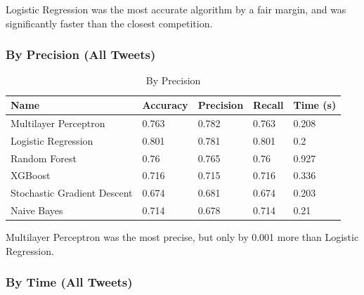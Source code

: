 \documentclass{article}
\begin{document}
Logistic Regression was the most accurate algorithm by a fair margin, and was significantly faster than the closest competition.

\subsubsection{By Precision (All Tweets)}

\begin{table}[h!]
	\begin{center}
		\caption{By Precision}
		\label{tab:table2}
		\begin{tabular}{l|l|l|l|l}
			\textbf{Name}               & \textbf{Accuracy} & \textbf{Precision} & \textbf{Recall} & \textbf{Time (s)} \\
			\hline
			Multilayer Perceptron       & 0.763             & 0.782              & 0.763           & 0.208             \\
			Logistic Regression         & 0.801             & 0.781              & 0.801           & 0.2               \\
			Random Forest               & 0.76              & 0.765              & 0.76            & 0.927             \\
			XGBoost                     & 0.716             & 0.715              & 0.716           & 0.336             \\
			Stochastic Gradient Descent & 0.674             & 0.681              & 0.674           & 0.203             \\
			Naive Bayes                 & 0.714             & 0.678              & 0.714           & 0.21              \\
		\end{tabular}
	\end{center}
\end{table}

Multilayer Perceptron was the most precise, but only by 0.001 more than Logistic Regression.

\subsubsection{By Time (All Tweets)}
\end{document}

